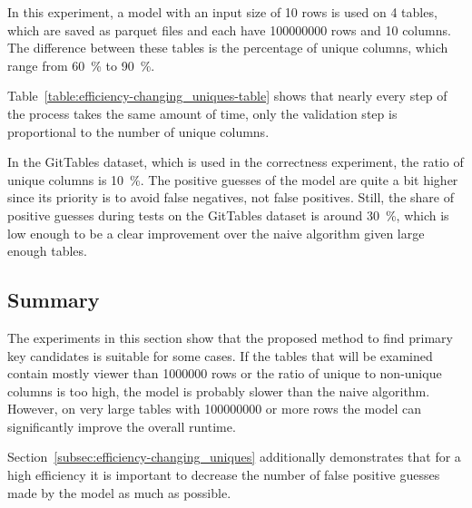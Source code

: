 In this experiment, a model with an input size of \num{10} rows is used on \num{4} tables, which are saved as parquet files and each have \num{100000000} rows and \num{10} columns. The difference between these tables is the percentage of unique columns, which range from \SI{60}{\percent} to \SI{90}{\percent}.

Table~\ref{table:efficiency-changing_uniques-table} shows that nearly every step of the process takes the same amount of time, only the validation step is proportional to the number of unique columns.

In the GitTables dataset, which is used in the correctness experiment, the ratio of unique columns is \SI{10}{\percent}. The positive guesses of the model are quite a bit higher since its priority is to avoid false negatives, not false positives. Still, the share of positive guesses during tests on the GitTables dataset is around \SI{30}{\percent}, which is low enough to be a clear improvement over the naive algorithm given large enough tables. %



\subsection{Summary}\label{subsec:efficiency-summary}
The experiments in this section show that the proposed method to find primary key candidates is suitable for some cases. If the tables that will be examined contain mostly viewer than \num{1000000} rows or the ratio of unique to non-unique columns is too high, the model is probably slower than the naive algorithm. However, on very large tables with \num{100000000} or more rows the model can significantly improve the overall runtime. %

Section~\ref{subsec:efficiency-changing_uniques} additionally demonstrates that for a high efficiency it is important to decrease the number of false positive guesses made by the model as much as possible.
